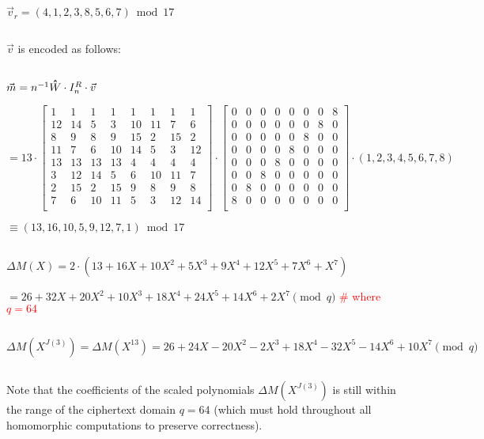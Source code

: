 $\vec{v}_r = (4, 1, 2, 3, 8, 5, 6, 7) \bmod 17$

$ $

$\vec{v}$ is encoded as follows:

$ $

$\vec{m} = n^{-1} \hathat W \cdot I_n^R \cdot \vec{v} $

$= 13 \cdot  \begin{bmatrix}
1 & 1 & 1 & 1 & 1 & 1 & 1 & 1\\
12&14&5&3&10&11&7&6\\
8&9&8&9&15&2&15&2\\
11&7&6&10&14&5&3&12\\
13&13&13&13&4&4&4&4\\
3&12&14&5&6&10&11&7\\
2&15&2&15&9&8&9&8\\
7&6&10&11&5&3&12&14\\
\end{bmatrix} \cdot \begin{bmatrix}
0 & 0 & 0 & 0 & 0 & 0 & 0 & 8\\
0 & 0 & 0 & 0 & 0 & 0 & 8 & 0\\
0 & 0 & 0 & 0 & 0 & 8 & 0 & 0\\
0 & 0 & 0 & 0 & 8 & 0 & 0 & 0\\
0 & 0 & 0 & 8 & 0 & 0 & 0 & 0\\
0 & 0 & 8 & 0 & 0 & 0 & 0 & 0\\
0 & 8 & 0 & 0 & 0 & 0 & 0 & 0\\
8 & 0 & 0 & 0 & 0 & 0 & 0 & 0\\
\end{bmatrix} \cdot (1,2,3,4,5,6,7,8) $

$ \equiv (13, 16, 10, 5, 9, 12, 7, 1)  \bmod 17$


$ $

$\Delta M(X) = 2\cdot(13 + 16X + 10X^2 + 5X^3 + 9X^4 + 12X^5 + 7X^6 + X^7)$

$ = 26 + 32X + 20X^2 + 10X^3 + 18X^4 + 24X^5 + 14X^6 + 2X^7 \pmod{q}$ \textcolor{red}{\text{ } \# where $q = 64$}

$ $


$\Delta M(X^{J(3)}) = \Delta M(X^{13}) = 26 + 24X - 20X^2 - 2X^3 + 18X^4 - 32X^5 - 14X^6 + 10X^7 \pmod{q}$

$ $

Note that the coefficients of the scaled polynomials $\Delta M(X^{J(3)})$ is still within the range of the ciphertext domain $q=64$ (which must hold throughout all homomorphic computations to preserve correctness). 

